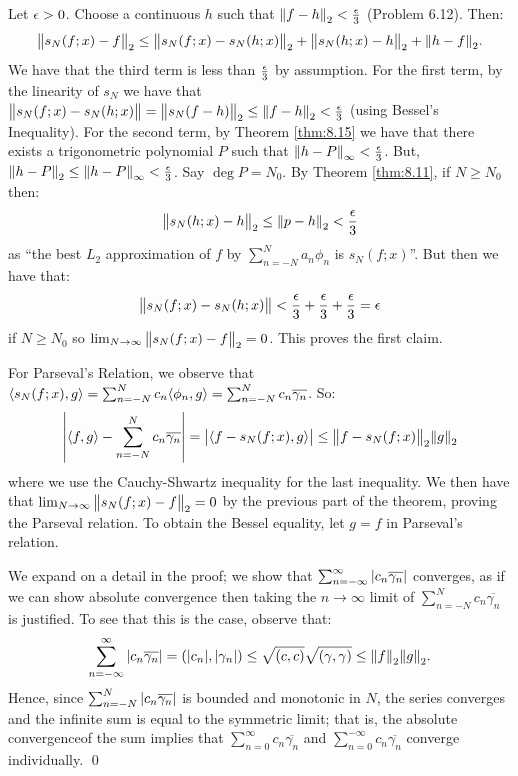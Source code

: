 \begin{nproof}
    Let $\epsilon > 0$. Choose a continuous $h$ such that $\norm{f- h}_2 < \frac{\epsilon}{3}$ (Problem 6.12). Then:
    \begin{align*}
        \norm{s_N(f;x) - f}_2 \leq \norm{s_N(f;x) - s_N(h;x)}_2 + \norm{s_N(h;x) - h}_2 + \norm{h - f}_2.
    \end{align*}
    We have that the third term is less than $\frac{\epsilon}{3}$ by assumption. For the first term, by the linearity of $s_N$ we have that $\norm{s_N(f;x) - s_N(h;x)} = \norm{s_N(f - h)}_2 \leq \norm{f-h}_2 < \frac{\epsilon}{3}$ (using Bessel's Inequality). For the second term, by Theorem \ref{thm:8.15} we have that there exists a trigonometric polynomial $P$ such that $\norm{h - P}_\infty < \frac{\epsilon}{3}$. But, $\norm{h - P}_2 \leq \norm{h - P}_\infty < \frac{\epsilon}{3}$. Say $\deg P = N_0$. By Theorem \ref{thm:8.11}, if $N \geq N_0$ then:
    \begin{align*}
        \norm{s_N(h;x) - h}_2 \leq \norm{p - h}_2 < \frac{\epsilon}{3}
    \end{align*}
    as ``the best $L_2$ approximation of $f$ by $\sum_{n= -N}^N a_n\phi_n$ is $s_N(f;x)$''. But then we have that:
    \begin{align*}
        \norm{s_N(f;x) - s_N(h;x)} < \frac{\epsilon}{3} + \frac{\epsilon}{3} + \frac{\epsilon}{3} = \epsilon
    \end{align*}
    if $N \geq N_0$ so $\lim_{N \rightarrow \infty}\norm{s_N(f;x) - f}_2 = 0$. This proves the first claim.

    For Parseval's Relation, we observe that $\langle s_N(f;x), g \rangle = \sum_{n=-N}^N c_n \langle \phi_n, g \rangle = \sum_{n=-N}^N c_n \overline{\gamma_n}$. So:
    \begin{align*}
        \abs{\langle f, g \rangle - \sum_{n=-N}^N c_n \overline{\gamma_n}} = \abs{\langle f - s_N(f;x), g \rangle} \leq \norm{f - s_N(f;x)}_2\norm{g}_2
    \end{align*}
    where we use the Cauchy-Shwartz inequality for the last inequality. We then have that $\lim_{N \rightarrow \infty}\norm{s_N(f;x) - f}_2 = 0$ by the previous part of the theorem, proving the Parseval relation. To obtain the Bessel equality, let $g = f$ in Parseval's relation.

    We expand on a detail in the proof; we show that $\sum_{n=-\infty}^\infty \abs{c_n\overline{\gamma_n}}$ converges, as if we can show absolute convergence then taking the $n \rightarrow \infty$ limit of $\sum_{n=-N}^N c_n\overline{\gamma_n}$ is justified. To see that this is the case, observe that:
    \begin{align*}
        \sum_{n=-\infty}^\infty \abs{c_n\overline{\gamma_n}} = (\abs{c_n}, \abs{\gamma_n}) \leq \sqrt{(c, c)}\sqrt{(\gamma, \gamma)} \leq \norm{f}_2\norm{g}_2.
    \end{align*}
    Hence, since $\sum_{n=-N}^N \abs{c_n\overline{\gamma_n}}$ is bounded and monotonic in $N$, the series converges and the infinite sum is equal to the symmetric limit; that is, the absolute convergenceof the sum implies that $\sum_{n=0}^\infty c_n\overline{\gamma_n}$ and $\sum_{n=0}^{-\infty}c_n\overline{\gamma_n}$ converge individually. \qed
\end{nproof}
